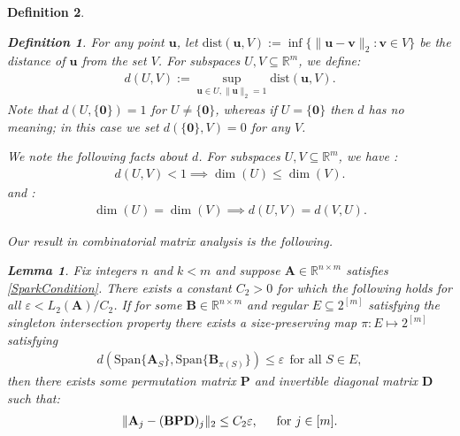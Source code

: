 \documentclass[9pt,twocolumn]{pnas-new}
\newtheorem{lemma}{Lemma}
\newtheorem{definition}{Definition}
\begin{document}
\begin{definition}
\begin{definition}\label{dDef}
For any point $\mathbf{u}$, let $\text{dist}(\mathbf{u}, V) := \inf \{\| \mathbf{u}-\mathbf{v} \|_2: \mathbf{v} \in V\}$ be the distance of $\mathbf{u}$ from the set $V$. For subspaces $U,V \subseteq \mathbb{R}^m$, we define: %
\begin{align}\label{d}
d(U,V) := \sup_{\mathbf{u} \in U, \|\mathbf{u}\|_2 = 1} \text{dist}(\mathbf{u},V).
\end{align}
Note that $d(U,\{\textbf{0}\}) = 1$ for $U \neq \{\mathbf{0}\}$, whereas if $U = \{\textbf{0}\}$ then $d$ has no meaning; in this case we set $d(\{\textbf{0}\},V) = 0$ for any $V$.
\end{definition}

We note the following facts about $d$. For subspaces $U,V \subseteq \mathbb{R}^m$, we have \cite[Cor.~2.6]{Kato2013}:
\begin{align}\label{dimLem}
d(U,V) < 1 \implies \dim(U) \leq \dim(V).
\end{align}
%
and \cite[Lem.~3.2]{Morris10}:
\begin{align}\label{eqdim}
\dim(U) = \dim(V) \implies d(U,V) = d(V,U).
\end{align}



Our result in combinatorial matrix analysis is the following.

\begin{lemma}\label{MainLemma}
Fix integers $n$ and $k < m$ and suppose $\mathbf{A} \in \mathbb{R}^{n \times m}$ satisfies \eqref{SparkCondition}. There exists a constant $C_2 > 0$ for which the following holds for all $\varepsilon < L_2(\mathbf{A}) / C_2$. If for some  $\mathbf{B} \in \mathbb{R}^{n \times m}$ and regular $E \subseteq2^{[m]}$ satisfying the singleton intersection property there exists a size-preserving map $\pi: E \mapsto 2^{[m]}$ satisfying
\begin{align}\label{GapUpperBound}
d(\text{Span}\{\mathbf{A}_{S}\}, \text{Span}\{\mathbf{B}_{\pi(S)}\}) \leq \varepsilon \ \ \text{for all $S \in E$},
\end{align}
%
then there exists some permutation matrix $\mathbf{P}$ and invertible diagonal matrix $\mathbf{D}$ such that:
\begin{align}\label{MainLemmaBPD}
\|\mathbf{A}_j - (\mathbf{BPD})_j\|_2 \leq C_2 \varepsilon, \indent \text{for } j \in [m].
\end{align}
\end{lemma}


\end{definition}
\end{document}
